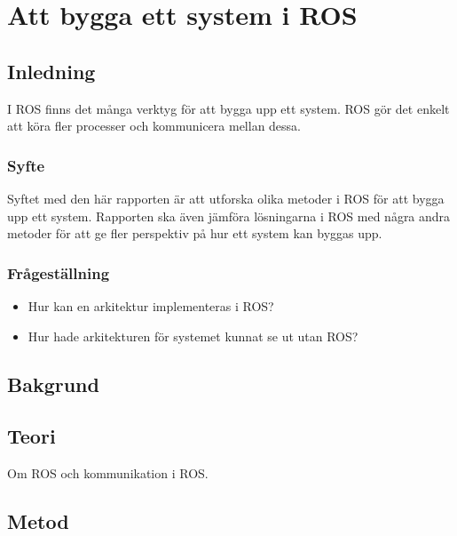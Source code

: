 \chapter{Att bygga ett system i ROS}
\label{cha:indiv-report-lundberg}

\section{Inledning}
\label{sec:introduction-lundberg}

I ROS finns det många verktyg för att bygga upp ett system. ROS gör det enkelt att köra fler processer och kommunicera mellan dessa.

\subsection{Syfte}
\label{sec:purpose-lundberg}

Syftet med den här rapporten är att utforska olika metoder i ROS för att bygga upp ett system. Rapporten ska även jämföra lösningarna i ROS med några andra metoder för att ge fler perspektiv på hur ett system kan byggas upp.

\subsection{Frågeställning}
\label{sec:issue-lundberg}

\begin{itemize}
	\item Hur kan en arkitektur implementeras i ROS?
	\item Hur hade arkitekturen för systemet kunnat se ut utan ROS?
\end{itemize}

\section{Bakgrund}
\label{sec:background-lundberg}


\section{Teori}
\label{sec:theory-lundberg}

Om ROS och kommunikation i ROS.

\section{Metod}
\label{sec:method-lundberg}

